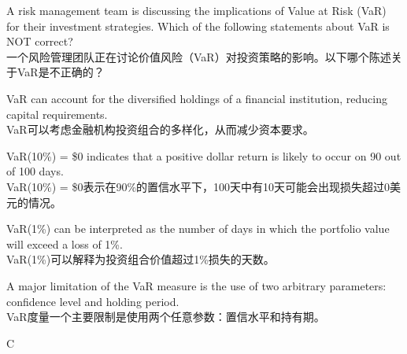 \documentclass{article}
\newcounter{question} %
\begin{document}
        \begin{question}
            A risk management team is discussing the implications of Value at Risk (VaR) for their investment strategies. Which of the following statements about VaR is NOT correct?
            \\一个风险管理团队正在讨论价值风险（VaR）对投资策略的影响。以下哪个陈述关于VaR是不正确的？
        \end{question}
        
        \begin{choices}
            \item VaR can account for the diversified holdings of a financial institution, reducing capital requirements.\\
            VaR可以考虑金融机构投资组合的多样化，从而减少资本要求。
            \item VaR(10\%) = \$0 indicates that a positive dollar return is likely to occur on 90 out of 100 days.\\
            VaR(10\%) = \$0表示在90\%的置信水平下，100天中有10天可能会出现损失超过0美元的情况。
            \item VaR(1\%) can be interpreted as the number of days in which the portfolio value will exceed a loss of 1\%.\\
            VaR(1\%)可以解释为投资组合价值超过1\%损失的天数。
            \item A major limitation of the VaR measure is the use of two arbitrary parameters: confidence level and holding period.\\
            VaR度量一个主要限制是使用两个任意参数：置信水平和持有期。
        \end{choices}
        
        \begin{correctanswer}
            C
        \end{correctanswer}
        
\end{document}
